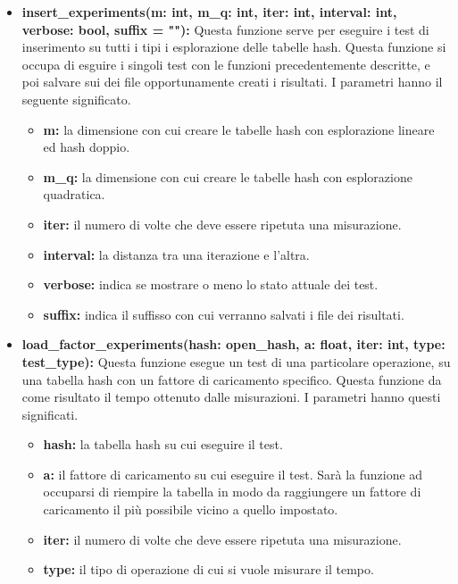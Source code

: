 \documentclass{article}
\newcommand{\newlineitem}[1]{\item \textbf{#1} \hfill \break}
\begin{document}
\begin{itemize}
\newlineitem{insert\_experiments(m: int, m\_q: int, iter: int, interval: int, verbose: bool,  suffix = ""):}
Questa funzione serve per eseguire i test di inserimento su tutti i tipi i esplorazione delle tabelle hash. Questa funzione si occupa di esguire i singoli test con le funzioni precedentemente descritte, e poi salvare sui dei file opportunamente creati i risultati. I parametri hanno il seguente significato.
\begin{itemize}
\item \textbf{m:} la dimensione con cui creare le tabelle hash con esplorazione lineare ed hash doppio.
\item \textbf{m\_q:} la dimensione con cui creare le tabelle hash con esplorazione quadratica.
\item \textbf{iter:} il numero di volte che deve essere ripetuta una misurazione.
\item \textbf{interval:} la distanza tra una iterazione e l'altra.
\item \textbf{verbose:} indica se mostrare o meno lo stato attuale dei test.
\item \textbf{suffix:} indica il suffisso con cui verranno salvati i file dei risultati.
\end{itemize}
\newlineitem{load\_factor\_experiments(hash: open\_hash, a: float, iter: int, type: test\_type):}
Questa funzione esegue un test di una particolare operazione, su una tabella hash con un fattore di caricamento specifico. Questa funzione da come risultato il tempo ottenuto dalle misurazioni. I parametri hanno questi significati.
\begin{itemize}
\item \textbf{hash:} la tabella hash su cui eseguire il test.
\item \textbf{a:} il fattore di caricamento su cui eseguire il test. Sarà la funzione ad occuparsi di riempire la tabella in modo da raggiungere un fattore di caricamento il più possibile vicino a quello impostato.
\item \textbf{iter:} il numero di volte che deve essere ripetuta una misurazione.
\item \textbf{type:} il tipo di operazione di cui si vuole misurare il tempo.
\end{itemize}


\end{itemize}
\end{document}
